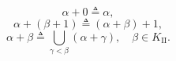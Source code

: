 $$\alpha + 0 \triangleq \alpha,$$
$$\alpha + (\beta + 1) \triangleq (\alpha + \beta) + 1,$$
$$\alpha + \beta \triangleq \bigcup_{\gamma < \beta} (\alpha + \gamma), \quad \beta \in K_{\mathrm{II}}.$$
